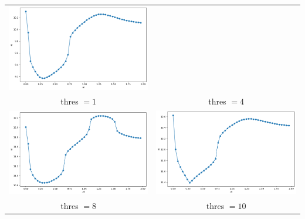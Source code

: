 \documentclass[a4paper,preprint,11pt]{article}
\begin{document}
\begin{center}
\begin{tabular}{cc}
\includegraphics[scale=0.35]{Corba_y-y0_z-z0_4.png} \\
thres $=1$ & thres $=4$ \\
\includegraphics[scale=0.35]{Corba_y-y0_z-z0_8.png} &
\includegraphics[scale=0.35]{Corba_y-y0_z-z0_10.png} \\
thres $=8$ & thres $=10$
\end{tabular}
\end{center}
\end{document}
